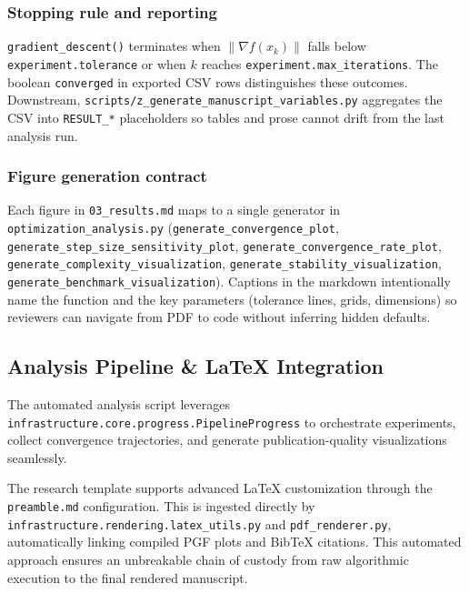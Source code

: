 \documentclass[
]{article}
\begin{document}
\subsubsection{Stopping rule and
reporting}\label{stopping-rule-and-reporting}

\texttt{gradient\_descent()} terminates when \(\|\nabla f(x_k)\|\) falls
below \texttt{experiment.tolerance} or when \(k\) reaches
\texttt{experiment.max\_iterations}. The boolean \texttt{converged} in
exported CSV rows distinguishes these outcomes. Downstream,
\texttt{scripts/z\_generate\_manuscript\_variables.py} aggregates the
CSV into \texttt{RESULT\_*} placeholders so tables and prose cannot
drift from the last analysis run.

\subsubsection{Figure generation
contract}\label{figure-generation-contract}

Each figure in \texttt{03\_results.md} maps to a single generator in
\texttt{optimization\_analysis.py}
(\texttt{generate\_convergence\_plot},
\texttt{generate\_step\_size\_sensitivity\_plot},
\texttt{generate\_convergence\_rate\_plot},
\texttt{generate\_complexity\_visualization},
\texttt{generate\_stability\_visualization},
\texttt{generate\_benchmark\_visualization}). Captions in the markdown
intentionally name the function and the key parameters (tolerance lines,
grids, dimensions) so reviewers can navigate from PDF to code without
inferring hidden defaults.

\subsection{Analysis Pipeline \& LaTeX
Integration}\label{analysis-pipeline-latex-integration}

The automated analysis script leverages
\texttt{infrastructure.core.progress.PipelineProgress} to orchestrate
experiments, collect convergence trajectories, and generate
publication-quality visualizations seamlessly.

The research template supports advanced LaTeX customization through the
\texttt{preamble.md} configuration. This is ingested directly by
\texttt{infrastructure.rendering.latex\_utils.py} and
\texttt{pdf\_renderer.py}, automatically linking compiled PGF plots and
BibTeX citations. This automated approach ensures an unbreakable chain
of custody from raw algorithmic execution to the final rendered
manuscript.
\end{document}
